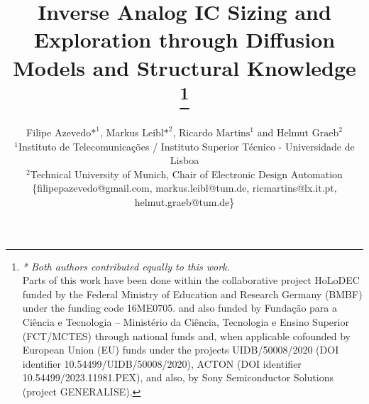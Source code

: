 \documentclass[conference]{IEEEtran}
\begin{document}

\title{Inverse Analog IC Sizing and Exploration through Diffusion Models and Structural Knowledge
\thanks{%
\textit{* Both authors contributed equally to this work.}\\
Parts of this work have been done within the collaborative project HoLoDEC funded by the Federal Ministry of Education and Research Germany (BMBF) under the funding code 16ME0705. and also funded by Fundação para a Ciência e Tecnologia – Ministério da Ciência, Tecnologia e Ensino Superior (FCT/MCTES) through national funds and, when applicable cofounded by European Union (EU) funds under the projects UIDB/50008/2020 (DOI identifier 10.54499/UIDB/50008/2020), ACTON (DOI identifier 10.54499/2023.11981.PEX), and also, by Sony Semiconductor Solutions (project GENERALISE).}}

\author{\small  Filipe $\text{Azevedo*}^{\text{1}}$, Markus $\text{Leibl*}^{\text{2}}$, Ricardo $\text{Martins}^{\text{1}}$ and Helmut $\text{Graeb}^{\text{2}}$\\ 
$^1$Instituto de Telecomunicações / Instituto Superior Técnico - Universidade de Lisboa\\
$^2$Technical University of Munich, Chair of Electronic Design Automation\\
\{filipepazevedo@gmail.com, markus.leibl@tum.de, ricmartins@lx.it.pt, helmut.graeb@tum.de\}}



\maketitle
\end{document}
